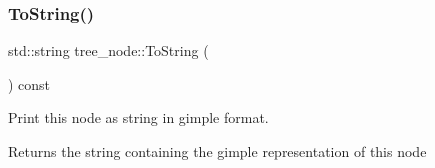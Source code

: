 \mbox{\label{classtree__node_a17760b9b2ecf3ad8bfd015ce90f60234}} 
\subsubsection{\texorpdfstring{To\+String()}{ToString()}}
{\footnotesize\ttfamily std\+::string tree\+\_\+node\+::\+To\+String (\begin{DoxyParamCaption}{ }\end{DoxyParamCaption}) const}



Print this node as string in gimple format. 

\begin{DoxyReturn}{Returns}
the string containing the gimple representation of this node 
\end{DoxyReturn}


